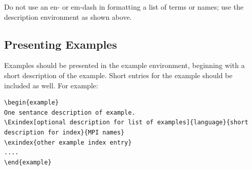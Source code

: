 \documentclass[letterpaper,twoside,11pt,fleqn]{article}
\begin{document}
Do not use an en- or em-dash in formatting a list of terms or
names; use the description environment as shown above.

\subsection{Presenting Examples}
\label{sec:examples}
Examples should be presented in the example environment, beginning
with a short description of the example.
Short entries for the example should be included as well.
For example:

\begin{verbatim}
\begin{example}
One sentance description of example.
\Exindex[optional description for list of examples]{language}{short
description for index}{MPI names}
\exindex{other example index entry}
....
\end{example}
\end{verbatim}
\end{document}
